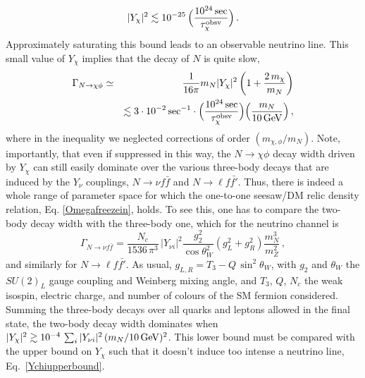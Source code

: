 \documentclass[prd,a4paper,twocolumn,preprintnumbers,nofootinbib,superscriptaddress]{revtex4}
\newcommand{\rupert}[1]{\textcolor{blue}{#1}}
\newcommand{\aritra}[1]{\textcolor{bostonuniversityred}{#1}}
\begin{document}
\begin{equation}
	|Y_\chi|^2\lesssim 10^{-25}\,\Big(\frac{10^{24}\,\hbox{sec}}{\tau_{\chi}^{\rm{obsv}}}\Big) \, .
		\label{Ychiupperbound}
\end{equation} 
Approximately saturating this bound leads to an observable neutrino line.
This small value of $Y_\chi$ implies that the decay of $N$ is quite slow,
\begin{eqnarray}
	\label{GammaN2body}
	\Gamma_{N\rightarrow  \chi\phi}&\simeq &\frac{1}{16\pi}m_{N} |Y_\chi|^2\left(1+\frac{2\,m_\chi}{m_N}\right)\\
	&&\lesssim 3\cdot 10^{-2}\,\hbox{sec}^{-1} \cdot \Big(\frac{10^{24}\,\hbox{sec}}{\tau_{\chi}^{{\rm obsv}}}\Big)\Big(\frac{m_N}{10\,\hbox{GeV}}\Big)\nonumber \, ,
\end{eqnarray}
where in the inequality we neglected corrections of order $(m_{\chi,\phi}/m_N)$.
Note, importantly, that even if suppressed in this way, the $N\rightarrow \chi \phi$ decay width driven by $Y_\chi$ can still easily dominate over the various three-body decays that are induced by the $Y_\nu$ couplings, $N\rightarrow \nu f \bar{f}$ and $N \to \ell f \bar{f'}$. Thus, there is indeed a whole range of parameter space for which the one-to-one seesaw/DM relic density relation, Eq. \eqref{Omegafreezein}, holds. To see this, one has to compare the two-body decay width with the three-body one, which for the neutrino channel is
\begin{equation}
	\Gamma_{N\rightarrow\nu f \bar{f}}=\frac{N_c}{1536\,\pi^3}\,|Y_{\nu i}|^2\frac{g_2^2}{\cos \theta_W^2} (g_L^2+g_R^2)\frac{m_{N}^3}{m_Z^2} \, ,
\end{equation}
and similarly for $N \to \ell f \bar{f'}$.
As usual, $g_{L,R}=T_3-Q\,\sin^2 \theta_W$, with $g_2$ and $\theta_W$ the $SU(2)_L$ gauge coupling and Weinberg mixing angle, and $T_3$, $Q$, $N_c$  the weak isospin, electric charge, 
and number of colours of the SM fermion considered. 
Summing the three-body decays over all quarks and leptons allowed in the final state, 
the two-body decay width dominates when $|Y_\chi|^2\gtrsim 10^{-4} \,\sum_i|Y_{\nu i}|^2 \,(m_{N}/10\,\hbox{GeV})^2 $. This lower bound must be compared with the upper bound on $Y_\chi$ such that it doesn't induce too intense a neutrino line, Eq.~\eqref{Ychiupperbound}. 
	
\end{document}
